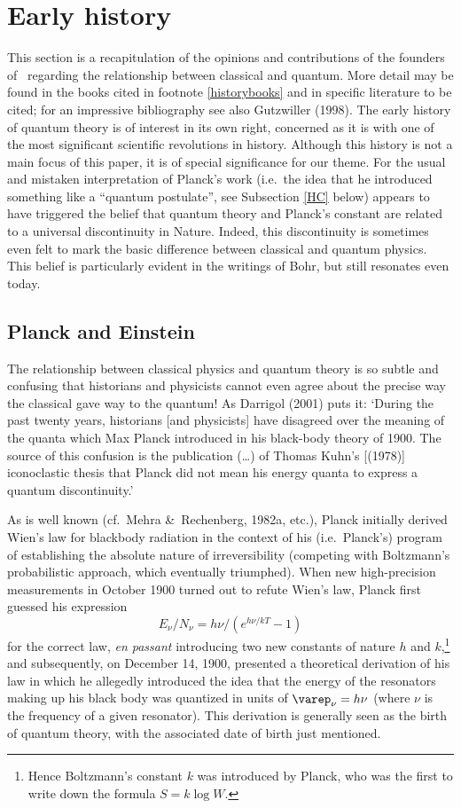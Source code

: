 \documentclass[12pt,titlepage]{article}
\newcommand{\beq}{\begin{equation}}
\newcommand{\eeq}{\end{equation}}
\begin{document}
\section{Early history}\label{S2}
This section is a recapitulation of the opinions and contributions of the founders of \qm\ regarding  the relationship between classical and quantum. More detail may be found in the books cited in footnote  \ref{historybooks} and in specific literature to be cited; for an impressive bibliography see also Gutzwiller (1998). 
The early history of quantum theory is of interest in its own right, concerned as it is with one of the most significant scientific revolutions in history. Although this history is not a main focus of this paper,  it is of special significance for our theme. For the usual and mistaken interpretation of Planck's work 
(i.e.\ the idea that he introduced something like a ``quantum postulate'', see Subsection \ref{HC} below) 
appears to have triggered the   belief that quantum theory and Planck's constant are related to a universal discontinuity in Nature. Indeed, this discontinuity is sometimes even felt to  mark the basic difference between classical and quantum physics. This belief is particularly evident in the writings of Bohr, but still resonates even today. 
\subsection{Planck and Einstein}
The relationship between classical physics and quantum theory is so subtle and confusing that historians and physicists cannot even agree about the precise way the classical gave way to the quantum! 
 As Darrigol (2001) puts it: `During the past twenty years, historians [and physicists] have disagreed over the meaning of the quanta which Max Planck introduced in his black-body theory of 1900. The source of this confusion is the publication (\ldots) of Thomas Kuhn's [(1978)] iconoclastic thesis that Planck did not mean his energy quanta to express a quantum discontinuity.' 

As is well known (cf.\ Mehra \&\ Rechenberg, 1982a, etc.), Planck initially derived Wien's law for blackbody radiation in the context  of his (i.e.\ Planck's) program of establishing the absolute nature of irreversibility (competing with  Boltzmann's probabilistic approach, which eventually triumphed). When new high-precision measurements in October 1900 turned out to refute Wien's law, Planck first guessed his  expression 
\beq  E_{\nu}/N_{\nu}=h\nu/(e^{h\nu/kT}-1) \label{Planck}\eeq
for the correct law,  \textit{en passant} introducing two new constants of nature $h$ and $k$,\footnote{Hence Boltzmann's constant $k$ was introduced by Planck, who was the first to write down the formula $S= k\log W$.} and subsequently, on December 14, 1900, presented a theoretical derivation of his law in which he allegedly introduced the idea that the energy of the resonators making up his black body was quantized in units of $\varep_{\nu}=h\nu$ (where $\nu$ is the frequency of a given resonator). This derivation is generally seen as the birth of quantum theory, with the associated date of birth just mentioned. 
\end{document}
